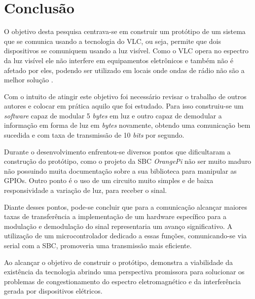 \section{Conclusão}

O objetivo desta pesquisa centrava-se em construir um protótipo de um sistema que se comunica usando a tecnologia do VLC, ou seja, permite que dois dispositivos se comuniquem usando a luz visível. Como o VLC opera no espectro da luz visível ele não interfere em equipamentos eletrônicos e também não é afetado por eles, podendo ser utilizado em locais onde ondas de rádio não são a melhor solução \cite{matheus2017comunicaccao}.

Com o intuito de atingir este objetivo foi necessário revisar o trabalho de outros autores e colocar em prática aquilo que foi estudado. Para isso construiu-se um \textit{software} capaz de modular 5 \textit{bytes} em luz e outro capaz de demodular a informação em forma de luz em \textit{bytes} novamente, obtendo uma comunicação bem sucedida e com taxa de transmissão de 10 \textit{bits} por segundo.

Durante o desenvolvimento enfrentou-se diversos pontos que dificultaram a construção do protótipo, como o projeto da SBC \textit{OrangePi} não ser muito maduro não possuindo muita documentação sobre a sua biblioteca para manipular as GPIOs. Outro ponto é o uso de um circuito muito simples e de baixa responsividade a variação de luz, para receber o sinal.

Diante desses pontos, pode-se concluir que para a comunicação alcançar maiores taxas de transferência a implementação de um hardware específico para a modulação e demodulação do sinal representaria um avanço significativo. A utilização de um microcontrolador dedicado a essas funções, comunicando-se via serial com a SBC, promoveria uma transmissão mais eficiente.

Ao alcançar o objetivo de construir o protótipo, demonstra a viabilidade da existência da tecnologia abrindo uma perspectiva promissora para solucionar os problemas de congestionamento do espectro eletromagnético e da interferência gerada por dispositivos elétricos. 


